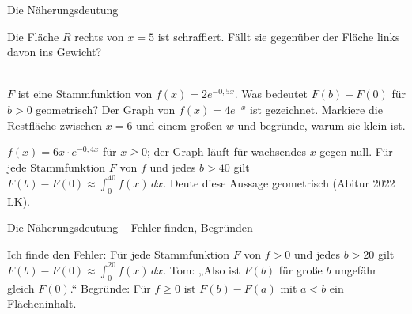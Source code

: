 \setcounter{aufgabe}{7}

\begin{aufgabe}{Die Näherungsdeutung}
\begin{teile}
\teil Die Fläche $R$ rechts von $x = 5$ ist schraffiert. Fällt sie gegenüber der Fläche links davon ins Gewicht? \\  \\ 

\begin{ksys}[xmin=0,xmax=10,ymin=0,ymax=3]\end{ksys}
\teil $F$ ist eine Stammfunktion von $f(x) = 2e^{-0{,}5x}$. Was bedeutet $F(b) - F(0)$ für $b > 0$ geometrisch?
\teil Der Graph von $f(x) = 4e^{-x}$ ist gezeichnet. Markiere die Restfläche zwischen $x = 6$ und einem großen $w$ und begründe, warum sie klein ist.

\begin{ksys}[xmin=0,xmax=10,ymin=0,ymax=4]\end{ksys}
\teil $f(x) = 6x \cdot e^{-0{,}4x}$ für $x \ge 0$; der Graph läuft für wachsendes $x$ gegen null. Für jede Stammfunktion $F$ von $f$ und jedes $b > 40$ gilt $F(b) - F(0) \approx ∫_0^{40} f(x)\,dx$. Deute diese Aussage geometrisch \hfill (Abitur 2022 LK).
\end{teile}
\end{aufgabe}

\begin{aufgabe}{Die Näherungsdeutung – Fehler finden, Begründen}
\begin{teile}
\teil Ich finde den Fehler: Für jede Stammfunktion $F$ von $f > 0$ und jedes $b > 20$ gilt $F(b) - F(0) \approx ∫_0^{20} f(x)\,dx$. Tom: „Also ist $F(b)$ für große $b$ ungefähr gleich $F(0)$.“
\teil Begründe: Für $f \ge 0$ ist $F(b) - F(a)$ mit $a < b$ ein Flächeninhalt.
\end{teile}
\end{aufgabe}
